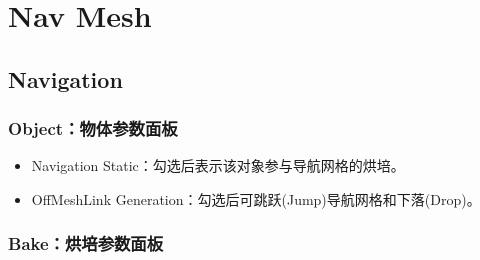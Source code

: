 \documentclass[9pt, b5paper]{article}
\begin{document}
\section{Nav Mesh}
\label{sec:org24d2d14}
\subsection{Navigation}
\label{sec:orge655028}
\subsubsection{Object：物体参数面板}
\label{sec:orgf902b2f}
\begin{itemize}
\item Navigation Static：勾选后表示该对象参与导航网格的烘培。
\item OffMeshLink Generation：勾选后可跳跃(Jump)导航网格和下落(Drop)。
\end{itemize}
\subsubsection{Bake：烘培参数面板　　}
\label{sec:orgfe5911f}
\end{document}
